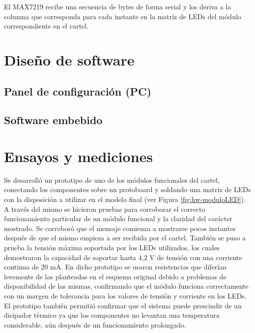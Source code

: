 El MAX7219 recibe una secuencia de bytes de forma serial y los deriva a la columna que corresponda para cada instante en la matriz de LEDs del módulo correspondiente en el cartel. 

\section{Diseño de software}
\subsection{Panel de configuración (PC)}
\subsection{Software embebido}


\section{Ensayos y mediciones}
Se desarrolló un prototipo de uno de los módulos funcionales del cartel, conectando los componentes sobre un protoboard y soldando una matriz de LEDs con la disposición a utilizar en el modelo final (ver Figura \ref{fig:hw-moduloLED}). A través del mismo se hicieron pruebas para corroborar el correcto funcionamiento particular de un módulo funcional y la claridad del carácter mostrado. Se corroboró que el mensaje comienza a mostrarse pocos instantes después de que el mismo empieza a ser recibido por el cartel. También se puso a prueba la tensión máxima soportada por los LEDs utilizados, los cuales demostraron la capacidad de soportar hasta 4,2 V de tensión con una corriente continua de 20 mA. En dicho prototipo se usaron resistencias que diferían levemente de las planteadas en el esquema original debido a problemas de disponibilidad de las mismas, confirmando que el módulo funciona correctamente con un margen de tolerancia para los valores de tensión y corriente en los LEDs. El prototipo también permitió confirmar que el sistema puede prescindir de un disipador térmico ya que los componentes no levantan una temperatura considerable, aún después de un funcionamiento prolongado.


